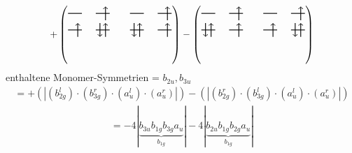 \documentclass{article}
\begin{document}
\vspace{0.5cm}
\[ +\left(\text{\begin{tikzpicture}
    \draw[thick] (0,0) -- (0.5,0); %
    \draw[thick] (1,0) -- (1.5,0); %
    \draw[thick] (0,-0.6) -- (0.5,-0.6); %
    \draw[thick] (1,-0.6) -- (1.5,-0.6); %
\draw[->, thick] (1.35, -0.25) -- (1.35, 0.25); 
\draw[-> , thick] (0.35, -0.85) -- (0.35, -0.35); 
 \draw[-> , thick] (1.35, -0.85) -- (1.35, -0.35); 
\draw[<- , thick] (1.15, -0.85) -- (1.15, -0.35); 
\end{tikzpicture}\qquad \begin{tikzpicture}
    \draw[thick] (0,0) -- (0.5,0); %
    \draw[thick] (1,0) -- (1.5,0); %
    \draw[thick] (0,-0.6) -- (0.5,-0.6); %
    \draw[thick] (1,-0.6) -- (1.5,-0.6); %
\draw[->, thick] (1.35, -0.25) -- (1.35, 0.25); 
\draw[-> , thick] (0.35, -0.85) -- (0.35, -0.35); 
\draw[<- , thick] (0.15, -0.85) -- (0.15, -0.35); 
 \draw[-> , thick] (1.35, -0.85) -- (1.35, -0.35); 
\end{tikzpicture}}\right)-\left(\text{\begin{tikzpicture}
    \draw[thick] (0,0) -- (0.5,0); %
    \draw[thick] (1,0) -- (1.5,0); %
    \draw[thick] (0,-0.6) -- (0.5,-0.6); %
    \draw[thick] (1,-0.6) -- (1.5,-0.6); %
\draw[->, thick] (1.35, -0.25) -- (1.35, 0.25); 
\draw[-> , thick] (0.35, -0.85) -- (0.35, -0.35); 
\draw[<- , thick] (0.15, -0.85) -- (0.15, -0.35); 
 \draw[-> , thick] (1.35, -0.85) -- (1.35, -0.35); 
\end{tikzpicture}\qquad \begin{tikzpicture}
    \draw[thick] (0,0) -- (0.5,0); %
    \draw[thick] (1,0) -- (1.5,0); %
    \draw[thick] (0,-0.6) -- (0.5,-0.6); %
    \draw[thick] (1,-0.6) -- (1.5,-0.6); %
\draw[->, thick] (1.35, -0.25) -- (1.35, 0.25); 
\draw[-> , thick] (0.35, -0.85) -- (0.35, -0.35); 
 \draw[-> , thick] (1.35, -0.85) -- (1.35, -0.35); 
\draw[<- , thick] (1.15, -0.85) -- (1.15, -0.35); 
\end{tikzpicture}}\right)\]enthaltene Monomer-Symmetrien = $b_{2u},b_{3u}$\begin{multline*}=+\left(\left|(b_{2g}^{l}) \cdot (b_{3g}^{r}) \cdot (a_{u}^{l}) \cdot (a_{u}^{r})\right|\right)-\left(\left|(b_{2g}^{r}) \cdot (b_{3g}^{l}) \cdot (a_{u}^{l}) \cdot (a_{u}^{r})\right|\right)\end{multline*}
\begin{multline*}
=-4\left|\underbrace{b_{3u} b_{1g} b_{3g} a_{u}}_{b_{1g}}\right|-4\left|\underbrace{b_{2u} b_{1g} b_{2g} a_{u}}_{b_{1g}}\right|
\end{multline*}
\\\\
\end{document}
